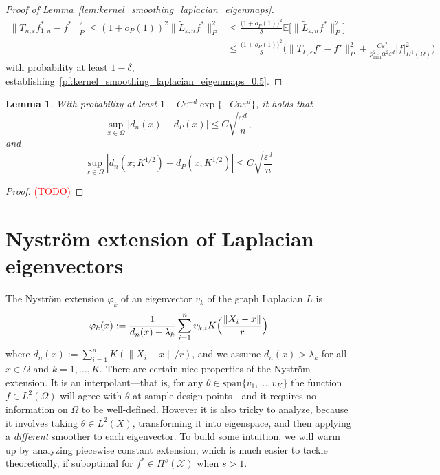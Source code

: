 \documentclass{article}
\newcommand{\1}{\mathbf{1}}
\newcommand{\Leb}{L}
\newcommand{\mc}[1]{\mathcal{#1}}
\newcommand{\wt}[1]{\widetilde{#1}}
\newtheorem{lemma}{Lemma}
\theoremstyle{definition}
\theoremstyle{remark}
\begin{document}
\begin{proof}[Proof of Lemma~\ref{lem:kernel_smoothing_laplacian_eigenmaps}]
	\begin{align*}
	\|T_{n,\varepsilon}f^{\ast}_{1:n} - f^{\ast}\|_P^2 \leq (1 + o_P(1))^2 \|\wt{L}_{\varepsilon,n}f^{\ast}\|_P^2 & \leq \frac{\bigl(1 + o_P(1)\bigr)^2}{\delta} \mathbb{E}\bigl[\|\wt{L}_{\varepsilon,n}f^{\ast}\|_P^2\bigr] \\ 
	& \leq \frac{\bigl(1 + o_P(1)\bigr)^2}{\delta}\biggl(\|T_{P,\varepsilon}f^{\star} - f^{\star}\|_{P}^2 + \frac{C\varepsilon^2}{p_{\min}^2 \alpha^2 \varepsilon^{d}} |f|_{H^1(\Omega)}^2\biggr)
	\end{align*}
	with probability at least $1 - \delta$, establishing~\eqref{pf:kernel_smoothing_laplacian_eigenmaps_0.5}.
\end{proof}

\begin{lemma}
	\label{lem:measure_of_ball_estimate}
	With probability at least $1 - C \varepsilon^{-d}\exp\{-Cn\varepsilon^d\}$, it holds that
	\begin{equation*}
	\sup_{x \in \Omega}|d_n(x) - d_P(x)| \leq C \sqrt{\frac{\varepsilon^d}{n}},
	\end{equation*}
	and
	\begin{equation*}
	\sup_{x \in \Omega}|d_n(x;K^{1/2}) - d_P(x;K^{1/2})| \leq C \sqrt{\frac{\varepsilon^d}{n}}
	\end{equation*}
\end{lemma}

\begin{proof}
	\textcolor{red}{(TODO)}
\end{proof}

\section{Nystr\"{o}m extension of Laplacian eigenvectors}
The Nystr\"{o}m extension $\varphi_k$ of an eigenvector $v_k$ of the graph Laplacian $L$ is
\begin{equation}
\label{eqn:nystrom}
\varphi_k(x) := \frac{1}{d_n(x) - \lambda_k} \sum_{i = 1}^{n} v_{k,i} K\Bigl(\frac{\|X_i - x\|}{r}\Bigr)
\end{equation}
where $d_n(x) := \sum_{i = 1}^{n} K(\|X_i - x\|/r)$, and we assume $d_n(x) > \lambda_k$ for all $x \in \Omega$ and $k = 1,\ldots,K$. There are certain nice properties of the Nystr\"{o}m extension. It is an interpolant---that is, for any $\theta \in \mathrm{span}\{v_1,\ldots,v_K\}$ the function $f \in \Leb^2(\Omega)$ will agree with $\theta$ at sample design points---and it requires no information on $\Omega$ to be well-defined. However it is also tricky to analyze, because it involves taking $\theta \in \Leb^2(X)$, transforming it into eigenspace, and then applying a \emph{different} smoother to each eigenvector. To build some intuition, we will warm up by analyzing piecewise constant extension, which is much easier to tackle theoretically, if suboptimal for $f^{\ast} \in H^s(\mc{X})$ when $s > 1$.
\end{document}
